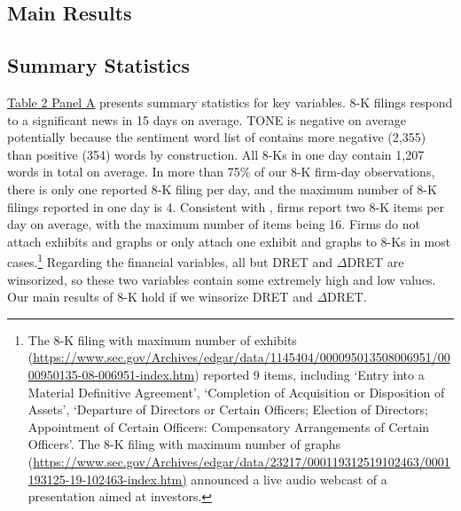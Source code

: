 \documentclass[letterpaper,12pt]{article}
\begin{document}
\begin{spacing}{1.5}
\section{Main Results}
\subsection{Summary Statistics}
\noindent \hyperref[T2PA]{Table 2 Panel A} presents summary statistics for key variables. 
8-K filings respond to a significant news in 15 days on average. TONE is negative on average potentially because the sentiment word list of  contains more negative (2,355) than positive (354) words by construction. All 8-Ks in one day contain 1,207 words in total on average. In more than 75\% of our 8-K firm-day observations, there is only one reported 8-K filing per day, and the maximum number of 8-K filings reported in one day is 4. Consistent with , firms report two 8-K items per day on average, with the maximum number of items being 16. Firms do not attach exhibits and graphs or only attach one exhibit and graphs to 8-Ks in most cases.\footnote{The 8-K filing with maximum number of exhibits (\url{https://www.sec.gov/Archives/edgar/data/1145404/000095013508006951/0000950135-08-006951-index.htm}) reported 9 items, including `Entry into a Material Definitive Agreement', `Completion of Acquisition or Disposition of Assets', `Departure of Directors or Certain Officers; Election of Directors; Appointment of Certain Officers: Compensatory Arrangements of Certain Officers'. The 8-K filing with maximum number of graphs (\url{https://www.sec.gov/Archives/edgar/data/23217/000119312519102463/0001193125-19-102463-index.htm)} announced a live audio webcast of a presentation aimed at investors.} Regarding the financial variables, all but DRET and $\Delta$DRET are winsorized, so these two variables contain some extremely high and low values. Our main results of 8-K hold if we winsorize DRET and $\Delta$DRET.


\end{spacing}
\end{document}
